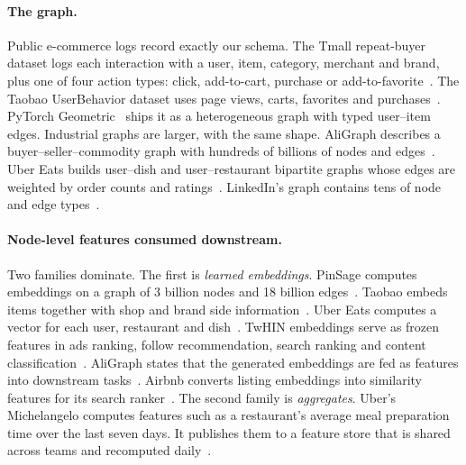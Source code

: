 \documentclass[10pt,twocolumn,letterpaper]{article}
\theoremstyle{definition}
\begin{document}
\paragraph{The graph.}
Public e-commerce logs record exactly our schema. The Tmall repeat-buyer
dataset logs each interaction with a user, item, category, merchant and
brand, plus one of four action types: click, add-to-cart, purchase or
add-to-favorite~\citep{tmall2015}. The Taobao UserBehavior dataset uses page
views, carts, favorites and purchases~\citep{taobao2018}. PyTorch
Geometric~\citep{fey2019pyg} ships it as a heterogeneous graph with typed
user--item edges. Industrial graphs are larger, with the same shape.
AliGraph describes a buyer--seller--commodity graph with hundreds of billions
of nodes and edges~\citep{zhu2019aligraph}. Uber Eats builds user--dish and
user--restaurant bipartite graphs whose edges are weighted by order counts and
ratings~\citep{sarda2019ubereats}. LinkedIn's graph contains tens of node and
edge types~\citep{borisyuk2024lignn}.

\paragraph{Node-level features consumed downstream.}
Two families dominate. The first is \emph{learned embeddings}. PinSage
computes embeddings on a graph of 3 billion nodes and 18 billion
edges~\citep{ying2018graph}. Taobao embeds items together with shop and brand
side information~\citep{wang2018billion}. Uber Eats computes a vector for each
user, restaurant and dish~\citep{sarda2019ubereats}. TwHIN embeddings serve as
frozen features in ads ranking, follow recommendation, search ranking and
content classification~\citep{elkishky2022twhin}. AliGraph states that the
generated embeddings are fed as features into downstream
tasks~\citep{zhu2019aligraph}. Airbnb converts listing embeddings into
similarity features for its search ranker~\citep{grbovic2018real}. The second
family is \emph{aggregates}. Uber's Michelangelo computes features such as a
restaurant's average meal preparation time over the last seven days. It
publishes them to a feature store that is shared across teams and recomputed
daily~\citep{hermann2017michelangelo}.
\end{document}
